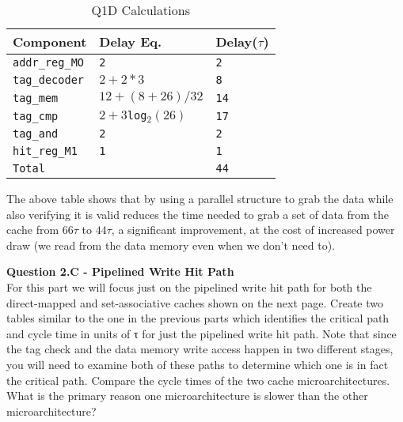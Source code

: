 \documentclass[a4paper,11pt]{article}
\newcommand{\T}{\texttt}
\newcommand{\V}{\verb}
\begin{document}
\begin{table}[H]
\caption{Q1D Calculations} \label{tab:q2Btable1} 
\begin{center}
\begin{tabular}{| l | l | l |}
\hline
  Component         &  Delay Eq.              & Delay($\tau$)          \\ \hline
  \V.addr_reg_MO.   &   \T{2}                 & \T{2}                  \\ \hline
  \V.tag_decoder.   &   \T{$2+2*3$}           & \T{8}                  \\ \hline
  \V.tag_mem.       &   \T{$12+(8+26)/32$}    & \T{14}                 \\ \hline
  \V.tag_cmp.       &   \T{$2+3$log$_2(26)$}  & \T{17}                 \\ \hline
  \V.tag_and.       &   \T{2}                 & \T{2}                  \\ \hline
  \V.hit_reg_M1.    &   \T{1}                 & \T{1}                  \\ \hline
  \V.Total.         &   \T{}                  & \T{44}                 \\ \hline
\end{tabular}
\end{center}
\end{table}

The above table shows that by using a parallel structure to grab the data while also verifying it is valid reduces the time needed to grab a set of data from the cache from $66\tau$ to $44\tau$, a significant improvement, at the cost of increased power draw (we read from the data memory even when we don't need to).

  
\item \textbf{Question 2.C - Pipelined Write Hit Path} \\
For this part we will focus just on the pipelined write hit path for both the direct-mapped and set-associative caches shown on the next page. Create two tables similar to the one in the previous parts which identifies the critical path and cycle time in units of τ for just the pipelined write hit path. Note that since the tag check and the data memory write access happen in two different stages, you will need to examine both of these paths to determine which one is in fact the critical path. Compare the cycle times of the two cache microarchitectures. What is the primary reason one microarchitecture is slower than the other microarchitecture?
\end{document}
